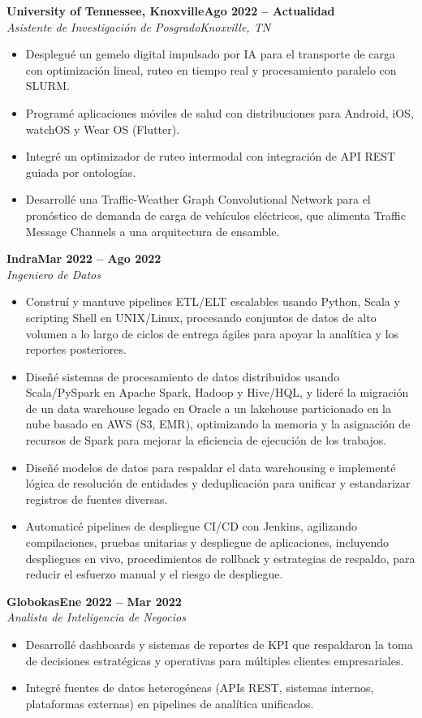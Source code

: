 \documentclass[10pt,letterpaper]{article}
\newcommand{\entry}[4]{%
  \vspace{3pt}\noindent\textbf{#1}\hfill\textbf{#2}\\[-1pt]
  \noindent\textit{#3}\hfill\textit{#4}\par\vspace{1pt}}
\newcommand{\entrynoloc}[3]{%
  \vspace{3pt}\noindent\textbf{#1}\hfill\textbf{#2}\\[-1pt]
  \noindent\textit{#3}\par\vspace{1pt}}
\begin{document}
\entry{University of Tennessee, Knoxville}{Ago 2022 -- Actualidad}{Asistente de Investigación de Posgrado}{Knoxville, TN}
\begin{itemize}
\item Desplegué un gemelo digital impulsado por IA para el transporte de carga con optimización lineal, ruteo en tiempo real y procesamiento paralelo con SLURM.
\item Programé aplicaciones móviles de salud con distribuciones para Android, iOS, watchOS y Wear OS (Flutter).
\item Integré un optimizador de ruteo intermodal con integración de API REST guiada por ontologías.
\item Desarrollé una Traffic-Weather Graph Convolutional Network para el pronóstico de demanda de carga de vehículos eléctricos, que alimenta Traffic Message Channels a una arquitectura de ensamble.
\end{itemize}

\entrynoloc{Indra}{Mar 2022 -- Ago 2022}{Ingeniero de Datos}
\begin{itemize}
\item Construí y mantuve pipelines ETL/ELT escalables usando Python, Scala y scripting Shell en UNIX/Linux, procesando conjuntos de datos de alto volumen a lo largo de ciclos de entrega ágiles para apoyar la analítica y los reportes posteriores.
\item Diseñé sistemas de procesamiento de datos distribuidos usando Scala/PySpark en Apache Spark, Hadoop y Hive/HQL, y lideré la migración de un data warehouse legado en Oracle a un lakehouse particionado en la nube basado en AWS (S3, EMR), optimizando la memoria y la asignación de recursos de Spark para mejorar la eficiencia de ejecución de los trabajos.
\item Diseñé modelos de datos para respaldar el data warehousing e implementé lógica de resolución de entidades y deduplicación para unificar y estandarizar registros de fuentes diversas.
\item Automaticé pipelines de despliegue CI/CD con Jenkins, agilizando compilaciones, pruebas unitarias y despliegue de aplicaciones, incluyendo despliegues en vivo, procedimientos de rollback y estrategias de respaldo, para reducir el esfuerzo manual y el riesgo de despliegue.
\end{itemize}

\entrynoloc{Globokas}{Ene 2022 -- Mar 2022}{Analista de Inteligencia de Negocios}
\begin{itemize}
\item Desarrollé dashboards y sistemas de reportes de KPI que respaldaron la toma de decisiones estratégicas y operativas para múltiples clientes empresariales.
\item Integré fuentes de datos heterogéneas (APIs REST, sistemas internos, plataformas externas) en pipelines de analítica unificados.
\end{itemize}
\end{document}
